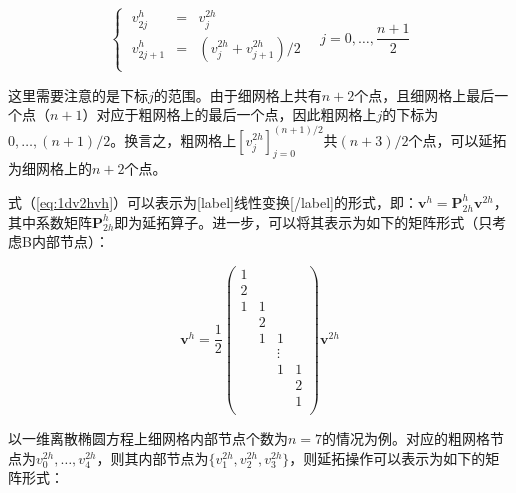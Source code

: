 \documentclass[12pt, UTF8, nofonts]{ctexart}
\begin{document}
\begin{equation}
  \label{eq:1dv2hvh}
  \left\{\; \begin{array}{lcl}
    v_{2j}^{h} &=& v_{j}^{2h} \\
    v_{2j+1}^{h} &=& \left( v_{j}^{2h} + v_{j+1}^{2h} \right) \big/ 2 \\
  \end{array} \right. \quad j = 0,\ldots,\dfrac{n+1}{2}
\end{equation}

这里需要注意的是下标$j$的范围。由于细网格上共有$n+2$个点，且细网格上最后一个点（$n+1$）对应于粗网格上的最后一个点，因此粗网格上$j$的下标为$0,\ldots,(n+1)/2$。换言之，粗网格上$\left[v_{j}^{2h}\right]_{j=0}^{(n+1)/2}$共$(n+3)/2$个点，可以延拓为细网格上的$n+2$个点。

式（\ref{eq:1dv2hvh}）可以表示为[label]线性变换[/label]的形式，即：$\boldsymbol{v}^h=\boldsymbol{P}_{2h}^{h}\boldsymbol{v}^{2h}$，其中系数矩阵$\boldsymbol{P}_{2h}^{h}$即为延拓算子。进一步，可以将其表示为如下的矩阵形式（只考虑B内部节点）：

\begin{equation}
  \label{eq:1dmatform}
  \boldsymbol{v}^h = \dfrac{1}{2}
  \begin{pmatrix}
    1 & & & \\
    2 & & & \\
    1 & 1 & & \\
    & 2 & & \\
    & 1 & 1 & \\
    & & \vdots & \\
    & & 1 & 1 \\
    & & & 2 \\
    & & & 1 \\
  \end{pmatrix} \boldsymbol{v}^{2h}
\end{equation}

以一维离散椭圆方程上细网格内部节点个数为$n=7$的情况为例。对应的粗网格节点为$v^{2h}_{0},\ldots,v^{2h}_{4}$，则其内部节点为$\{v^{2h}_{1},v^{2h}_{2},v^{2h}_{3}\}$，则延拓操作可以表示为如下的矩阵形式：
\end{document}
